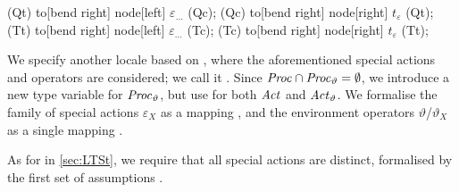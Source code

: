 \begin{isabellebody}
\begin{isamarkuptext}
{{{{    \draw [dotted,->,shorten >= 7pt] (Qt) to[bend right] node[left] {$\varepsilon_{\dots}$} (Qc);
    \draw [dotted,->,shorten <= 7pt] (Qc) to[bend right] node[right] {$t_\varepsilon$} (Qt);
    \draw [dotted,->,shorten >= 7pt] (Tt) to[bend right] node[left] {$\varepsilon_{\dots}$} (Tc);
    \draw [dotted,->,shorten <= 7pt] (Tc) to[bend right] node[right] {$t_\varepsilon$} (Tt);
}}}}
\vspace{-1cm}%
\end{isamarkuptext}\isamarkuptrue%
%
\isadelimdocument
%
\endisadelimdocument
%
\isatagdocument
%
\isamarkuptrue%
%
\isamarkuptrue%
%
\endisatagdocument
{\isafolddocument}%
%
\isadelimdocument
%
\endisadelimdocument
%
\begin{isamarkuptext}%
We specify another locale based on , where the aforementioned special actions and operators are considered; we call it . 
Since $\mathit{Proc} \cap \mathit{Proc}_\vartheta = \emptyset$, we introduce a new type variable  for $\mathit{Proc}_\vartheta$, but use  for both $\mathit{Act}$ and $\mathit{Act}_\vartheta$.
We formalise the family of special actions $\varepsilon_X$ as a mapping , and the environment operators $\vartheta$/$\vartheta_X$ as a single mapping .

As for  in \cref{sec:LTSt}, we require that all special actions are distinct, formalised by the first set of assumptions .


\end{isamarkuptext}
\end{isabellebody}
